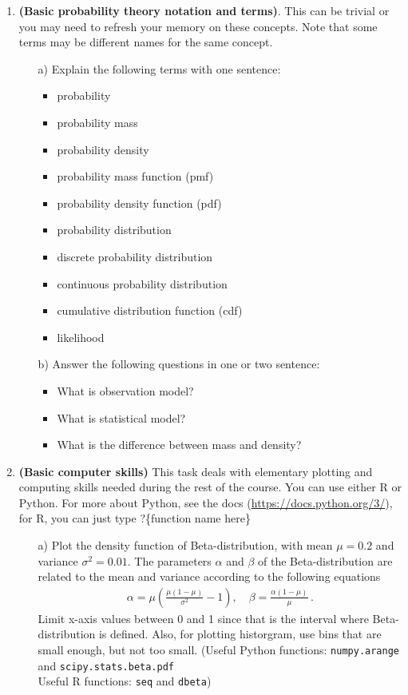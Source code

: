 \documentclass[11pt,a4paper,english]{article}
\begin{document}
\begin{enumerate}

\item {\bf (Basic probability theory notation and terms)}. This can be trivial or you may need to refresh your memory on these concepts. Note that some terms may be different names for the same concept.
  \begin{itemize}
  \item[a)] Explain the following terms with one sentence:
    \begin{itemize}
    \item probability
    \item probability mass
    \item probability density
    \item probability mass function (pmf)
    \item probability density function (pdf)
    \item probability distribution
    \item discrete probability distribution
    \item continuous probability distribution
    \item cumulative distribution function (cdf)
    \item likelihood
    \end{itemize}
  \item[b)] Answer the following questions in one or two sentence:
    \begin{itemize}
    \item What is observation model?
    \item What is statistical model?
    \item What is the difference between mass and density?
    \end{itemize}
  \end{itemize}

\item {\bf (Basic computer skills)} This task deals with elementary plotting and computing skills needed during the rest of the course. You can use either R or Python.
For more about Python, see the docs (\href{https://docs.python.org/3/}{https://docs.python.org/3/}), for R, you can just type ?\{function name here\}
\begin{itemize}
	\item[a)] Plot the density function of Beta-distribution, with mean $\mu = 0.2$ and variance $\sigma^2=0.01$. The parameters $\alpha$ and $\beta$ of the Beta-distribution are related to the mean and variance according to the following equations
	\begin{align*}
	\alpha = \mu \left( \frac{\mu(1-\mu)}{\sigma^2} - 1 \right), \quad
	\beta = \frac{\alpha (1-\mu) }{\mu} \,.
\end{align*}
Limit x-axis values between 0 and 1 since that is the interval where Beta-distribution is defined. Also, for plotting historgram, use bins that are small enough, but not too small.
(Useful Python functions: {\tt numpy.arange} and {\tt scipy.stats.beta.pdf}
 \\Useful R functions: {\tt seq} and {\tt dbeta})


\end{itemize}
\end{enumerate}
\end{document}
